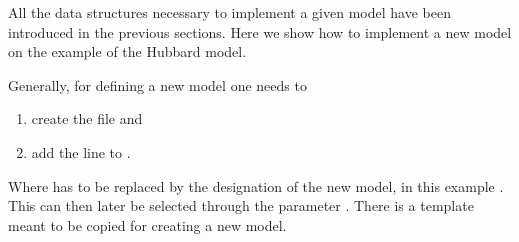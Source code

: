 

All the data structures necessary to implement a given model have been introduced in the previous sections. Here we show how to implement a new model on the example of the Hubbard model.

Generally, for defining a new model one needs to 
\begin{enumerate}
\item create the file  and
\item add the line  to .
\end{enumerate}
Where  has to be replaced by the designation of the new model, in this example . This can then later be selected through the parameter . There is a template  meant to be copied for creating a new model.

